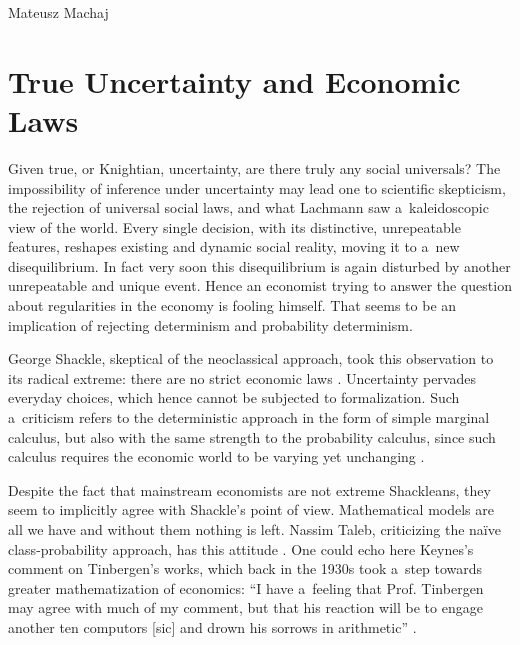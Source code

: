 \begin{artengenv}{Mateusz Machaj}
\section{True Uncertainty and Economic Laws}

Given true, or Knightian, uncertainty, are there truly any social universals? The impossibility of inference under uncertainty may lead one to scientific skepticism, the rejection of universal social laws, and what Lachmann 
\parencite*[][]{lachmann_mises_1976} %
 saw a~kaleidoscopic view of the world. Every single decision, with its distinctive, unrepeatable features, reshapes existing and dynamic social reality, moving it to a~new disequilibrium. In fact very soon this disequilibrium is again disturbed by another unrepeatable and unique event. Hence an economist trying to answer the question about regularities in the economy is fooling himself. That seems to be an implication of rejecting determinism and probability determinism.



George Shackle, skeptical of the neoclassical approach, took this observation to its radical extreme: there are no strict economic laws 
\parencite[][p.427]{shackle_epistemics_1972}. %
 Uncertainty pervades everyday choices, which hence cannot be subjected to formalization. Such a~criticism refers to the deterministic approach in the form of simple marginal calculus, but also with the same strength to the probability calculus, since such calculus requires the economic world to be varying yet unchanging 
\parencite[][p.381]{shackle_epistemics_1972}.%




Despite the fact that mainstream economists are not extreme Shackleans, they seem to implicitly agree with Shackle's point of view. Mathematical models are all we have and without them nothing is left. Nassim Taleb, criticizing the naïve class-probability approach, has this attitude 
\parencite[][p.276]{taleb_black_2007}. %
 One could echo here Keynes's comment on Tinbergen's works, which back in the 1930s took a~step towards greater mathematization of economics: ``I have a~feeling that Prof. Tinbergen may agree with much of my comment, but that his reaction will be to engage another ten computors [sic] and drown his sorrows in arithmetic'' 
\parencite[][p.568]{keynes_professor_1939}.%





\end{artengenv}
